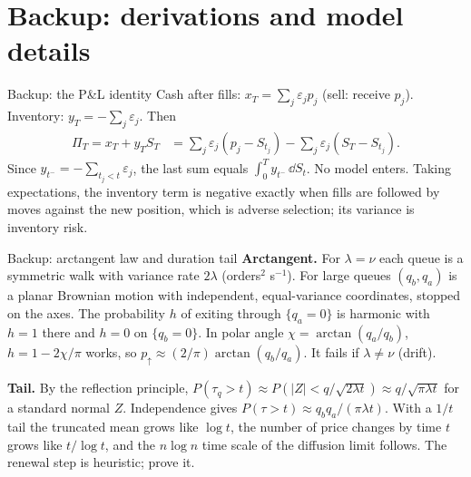 \section{Backup: derivations and model details}

\begin{frame}{Backup: the P\&L identity}
  \small
  Cash after fills: $x_T = \sum_j \varepsilon_j p_j$ (sell: receive $p_j$). Inventory: $y_T = -\sum_j\varepsilon_j$. Then
  \begin{align*}
    \Pi_T = x_T + y_T S_T &= \sum_j \varepsilon_j (p_j - S_{t_j}) - \sum_j \varepsilon_j (S_T - S_{t_j}) .
  \end{align*}
  Since $y_{t^-} = -\sum_{t_j < t}\varepsilon_j$, the last sum equals $\int_0^T y_{t^-}\,\dd S_t$. No model enters. Taking expectations, the inventory term is negative exactly when fills are followed by moves against the new position, which is adverse selection; its variance is inventory risk.
\end{frame}

\begin{frame}{Backup: arctangent law and duration tail}
  \small
  \textbf{Arctangent.} For $\lambda = \nu$ each queue is a symmetric walk with variance rate $2\lambda$ (orders$^2$ s$^{-1}$). For large queues $(q_b, q_a)$ is a planar Brownian motion with independent, equal-variance coordinates, stopped on the axes. The probability $h$ of exiting through $\{q_a = 0\}$ is harmonic with $h=1$ there and $h = 0$ on $\{q_b = 0\}$. In polar angle $\chi = \arctan(q_a/q_b)$, $h = 1 - 2\chi/\pi$ works, so $p_\uparrow \approx (2/\pi)\arctan(q_b/q_a)$. It fails if $\lambda\ne\nu$ (drift).

  \vspace{0.5em}
  \textbf{Tail.} By the reflection principle, $P(\tau_q > t)\approx P(|Z| < q/\sqrt{2\lambda t}) \approx q/\sqrt{\pi\lambda t}$ for a standard normal $Z$. Independence gives $P(\tau>t)\approx q_bq_a/(\pi\lambda t)$. With a $1/t$ tail the truncated mean grows like $\log t$, the number of price changes by time $t$ grows like $t/\log t$, and the $n\log n$ time scale of the diffusion limit follows. The renewal step is heuristic; \citet{cont2013price} prove it.
\end{frame}

